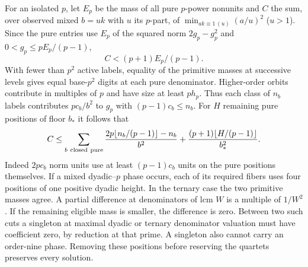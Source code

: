 \documentclass[11pt]{amsart}
\numberwithin{equation}{section}
\theoremstyle{definition}
\theoremstyle{plain}
\begin{document}
For an isolated $p$, let $E_p$ be the mass of all pure $p$-power
nonunits and $C$ the sum, over observed mixed $b=uk$ with $u$ its
$p$-part, of $\min_{ak\equiv1\, (u)}(a/u)^2$ ($u>1$). Since the pure
entries use $E_p$ of the squared norm $2g_p-g_p^2$ and
$0<g_p\le pE_p/(p-1)$,
\[
 C<(p+1)E_p/(p-1).
\]
With fewer than $p^2$ active labels, equality of the primitive masses
at successive levels gives equal base-$p^2$ digits at each pure
denominator. Higher-order orbits contribute in multiples of $p$
and have size at least $ph_p$. Thus each class of $n_b$ labels contributes
$pc_b/b^2$ to $g_p$ with $(p-1)c_b\le n_b$. For $H$ remaining
pure positions of floor $b_*$ it follows that
\[
 C\le\sum_{b\ {\rm closed\ pure}}
 \frac{2p\lfloor n_b/(p-1)\rfloor-n_b}{b^2}
 +\frac{(p+1)\lfloor H/(p-1)\rfloor}{b_*^2}.
\]
Indeed $2pc_b$ norm units use at least $(p-1)c_b$ units on the pure
positions themselves. If a mixed dyadic--$p$ phase occurs,
each of its required fibers uses four positions of one positive dyadic
height. In the ternary case the two primitive masses agree. A partial
difference at denominators of lcm $W$ is a multiple of $1/W^2$. If the
remaining eligible mass is smaller, the difference is zero.
Between two such cuts a singleton at maximal dyadic or ternary
denominator valuation must have coefficient zero, by reduction at that
prime. A singleton also cannot carry an order-nine phase. Removing these
positions before reserving the quartets preserves every solution.
\end{document}
